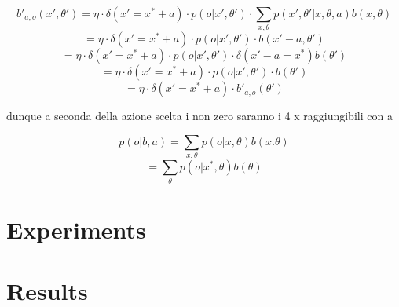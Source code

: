 \documentclass[12pt,a4paper]{article}
\begin{document}
$$b'_{a,o}(x',\theta') = \eta \cdot \delta(x'=x^*+a) \cdot p(o|x',\theta') \cdot \sum_{x,\theta}p(x',\theta'|x,\theta,a)b(x,\theta)$$
$$ = \eta \cdot \delta(x'=x^*+a) \cdot p(o|x',\theta') \cdot b(x'-a,\theta') $$
$$ = \eta \cdot \delta(x'=x^*+a) \cdot p(o|x',\theta') \cdot \delta (x'-a = x^* )b(\theta') $$
$$ = \eta \cdot \delta(x'=x^*+a) \cdot p(o|x',\theta') \cdot b(\theta') $$
$$ = \eta \cdot \delta(x'=x^*+a) \cdot b'_{a,o}(\theta')$$

dunque a seconda della azione scelta i non zero saranno i 4 x raggiungibili con a

$$p(o|b,a) = \sum_{x,\theta}p(o|x,\theta)b(x.\theta)$$
$$ = \sum_{\theta}p(o|x^*,\theta)b(\theta)$$
\newpage
\section{Experiments}
\section{Results}




\newpage


\end{document}
